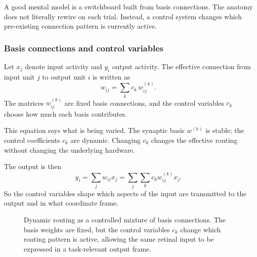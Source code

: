 A good mental model is a switchboard built from basis connections. The anatomy does not literally rewire on each trial. Instead, a control system changes which pre-existing connection pattern is currently active.

\subsubsection{Basis connections and control variables}

Let \(x_j\) denote input activity and \(y_i\) output activity. The effective connection from input unit \(j\) to output unit \(i\) is written as
\[
w_{ij} = \sum_k c_k\, w^{(k)}_{ij}.
\]
The matrices \(w^{(k)}_{ij}\) are fixed basis connections, and the control variables \(c_k\) choose how much each basis contributes.

This equation says what is being varied. The synaptic basis \(w^{(k)}\) is stable; the control coefficients \(c_k\) are dynamic. Changing \(c_k\) changes the effective routing without changing the underlying hardware.

The output is then
\[
y_i = \sum_j w_{ij}x_j = \sum_j \sum_k c_k w^{(k)}_{ij}x_j.
\]
So the control variables shape which aspects of the input are transmitted to the output and in what coordinate frame.

\begin{figure}[!htbp]
\centering
{}
\caption{Dynamic routing as a controlled mixture of basis connections. The basis weights are fixed, but the control variables \(c_k\) change which routing pattern is active, allowing the same retinal input to be expressed in a task-relevant output frame.}
\end{figure}


